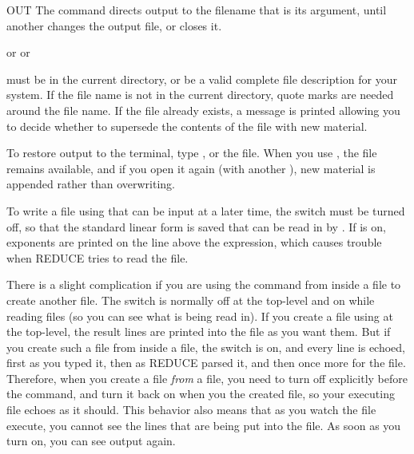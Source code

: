\begin{Command}{OUT}
The  command directs output to the filename that is its argument,
until another  changes the output file, or  closes it.
\begin{Syntax}
  or   or 
\end{Syntax}

 must be in the current directory, or be a valid complete
file description for your system.  If the file name is not
in the current directory, quote marks are needed around the file name.
If the file already exists, a message is printed allowing you to decide
whether to supersede the contents of the file with new material.

\begin{Comments}
To restore output to the terminal, type , or  the
file.  When you use , the file remains available, and if you
open it again (with another ), new material is appended rather
than overwriting.

To write a file using  that can be input at a later time, the
switch  must be turned off, so that the standard linear form
is saved that can be read in by .  If  is on, exponents
are printed on the line above the expression, which causes trouble
when REDUCE tries to read the file.

There is a slight complication if you are using the  command from
inside a file to create another file.  The  switch is normally
off at the top-level and on while reading files (so you can see what is
being read in).  If you create a file using  at the top-level,
the result lines are printed into the file as you want them.  But if you
create such a file from inside a file, the  switch is on, and
every line is echoed, first as you typed it, then as REDUCE parsed it, and
then once more for the file.  Therefore, when you create a file {\it from}
a file, you need to turn  off explicitly before the 
command, and turn it back on when you  the created file, so your
executing file echoes as it should.  This behavior also means that as you
watch the file execute, you cannot see the lines that are being put into
the  file.  As soon as you turn  on, you can see
output again.
\end{Comments}
\end{Command}


